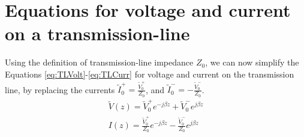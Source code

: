 \documentclass{ximera}
\begin{document}
\section{Equations for voltage and current on a transmission-line}

Using the definition of transmission-line impedance $Z_0$, we can now simplify the Equations \ref{eq:TLVolt}-\ref{eq:TLCurr} for voltage and current on the transmission line, by replacing the currents $\tilde{I}_0^+=\frac{\tilde{V}_0^+}{Z_0} $, and $\tilde{I}_0^- = -\frac{\tilde{V}_0^-}{Z_0}$.
\begin{eqnarray}
\tilde{V}(z)=\tilde{V}_0^+ e^{-j \beta z} +\tilde{V}_0^- e^{j \beta z} \label{eq:TLIvtl} \\ 
I(z)=\frac{\tilde{V}_0^+}{Z_0} e^{- j \beta z} - \frac{\tilde{V}_0^-}{Z_0} e^{j \beta z}\label{eq:TLIctl}
\end{eqnarray}
 
\end{document}

